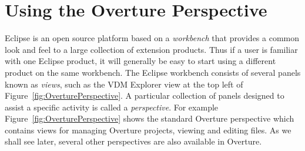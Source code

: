 

\section{Using the Overture Perspective}\label{sec:vdmsupport}

Eclipse is an open source platform based on a \emph{workbench} that
provides a common look and feel to a large collection of extension
products. Thus if a user is familiar with one Eclipse product, it will
generally be easy to start using a different product on the same
workbench. The Eclipse workbench consists of several panels known as
\emph{views}, such as the VDM Explorer view at the top left of
Figure~\ref{fig:OverturePerspective}. A particular
collection of panels designed to assist a specific activity is called
a \emph{perspective}. For example
Figure~\ref{fig:OverturePerspective} shows the standard
Overture perspective which contains views for managing Overture
projects, viewing and editing files. As we shall see later, several
other perspectives are also available in Overture.

